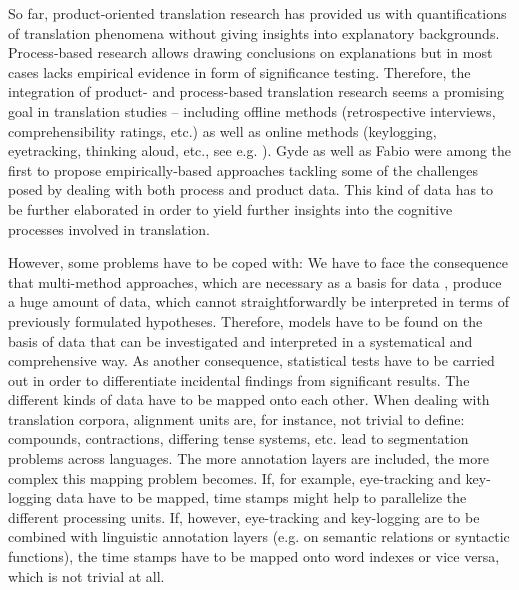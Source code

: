 \begin{refsection}
So far, product-oriented translation research has provided us with quantifications of translation phenomena without giving insights into explanatory backgrounds. Process-based research allows drawing conclusions on explanations but in most cases lacks empirical evidence in form of significance testing. Therefore, the integration of product- and process-based translation research seems a promising goal in translation studies – including offline methods (retrospective interviews, comprehensibility ratings, etc.) as well as online methods (keylogging, eyetracking, thinking aloud, etc., see e.g. \citealt{Krings2005}). Gyde \citet{Hansen2002} as well as Fabio \citet{Alves:2003va} were among the first to propose empirically-based approaches tackling some of the challenges posed by dealing with both process and product data. This kind of data  has to be further elaborated in order to yield further insights into the cognitive processes involved in translation. 

However, some problems have to be coped with: We have to face the consequence that multi-method approaches, which are necessary as a basis for data , produce a huge amount of data, which cannot straightforwardly be interpreted in terms of previously formulated hypotheses. Therefore, models have to be found on the basis of data that can be investigated and interpreted in a systematical and comprehensive way. As another consequence, statistical tests have to be carried out in order to differentiate incidental findings from significant results. The different kinds of data have to be mapped onto each other. When dealing with translation corpora, alignment units are, for instance, not trivial to define: compounds, contractions, differing tense systems, etc. lead to segmentation problems across languages. The more annotation layers are included, the more complex this mapping problem becomes. If, for example, eye-tracking and key-logging data have to be mapped, time stamps might help to parallelize the different processing units. If, however, eye-tracking and key-logging are to be combined with linguistic annotation layers (e.g. on semantic relations or syntactic functions), the time stamps have to be mapped onto word indexes or vice versa, which is not trivial at all.


\end{refsection}
